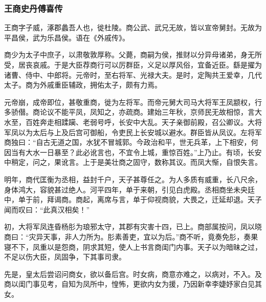 \documentclass[]{article}
\begin{document}
\hypertarget{header-n5657}{%
\subsubsection{王商史丹傅喜传}\label{header-n5657}}

王商字子威，涿郡蠡吾人也，徙杜陵。商公武、武兄无故，皆以宣帝舅封。无故为平昌侯，武为乐昌侯。语在《外戚传》。

商少为太子中庶子，以肃敬敦厚称。父薨，商嗣为侯，推财以分异母诸弟，身无所受，居丧哀戚。于是大臣荐商行可以厉群臣，义足以厚风俗，宜备近臣。繇是擢为诸曹、侍中、中郎将。元帝时，至右将军、光禄大夫。是时，定陶共王爱幸，几代太子。商为外戚重臣辅政，拥佑太子，颇有力焉。

元帝崩，成帝即位，甚敬重商，徙为左将军。而帝元舅大司马大将军王凤颛权，行多骄僣。商论议不能平凤，凤知之，亦疏商。建始三年秋，京师民无故相惊，言大水至，百姓奔走相蹂躏、老弱号呼，长安中大乱。天子亲御前殿，召公卿议。大将军凤以为太后与上及后宫可御船，令吏民上长安城以避水。群臣皆从凤议。左将军商独曰：``自古无道之国，水犹不冒城郭。今政治和平，世无兵革，上下相安，何因当有大水一日暴至？此必讹言也，不宜令上城，重惊百姓。''上乃止。有顷，长安中稍定，问之，果讹言。上于是美壮商之固守，数称其议。而凤大惭，自恨失言。

明年，商代匡衡为丞相，益封千户，天子甚尊任之。为人多质有威重，长八尺余，身体鸿大，容貌甚过绝人。河平四年，单于来朝，引见白虎殿。丞相商坐未央廷中，单于前，拜谒商。商起，离席与言，单于仰视商貌，大畏之，迁延却退。天子闻而叹曰：``此真汉相矣！''

初，大将军凤连昏杨肜为琅邪太守，其郡有灾害十四，已上。商部属按问，凤以晓商曰：``灾异天事，非人力所为。肜素善吏，宜以为后。''商不听，竟奏免肜，奏果寝不下，凤重以是怨商，阴求其短，使人上书言商闺门内事。天子以为暗昧之过，不足以伤大臣，凤固争，下其事司隶。

先是，皇太后尝诏问商女，欲以备后宫。时女病，商意亦难之，以病对，不入。及商以闺门事见考，自知为凤所中，惶怖，更欲内女为援，乃因新幸李婕妤家白见其女。
\end{document}

